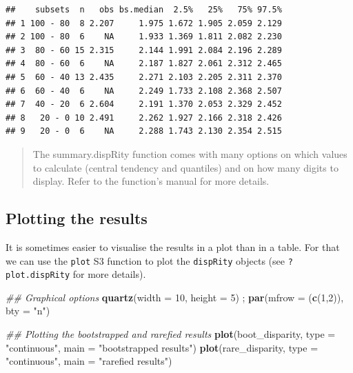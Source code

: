 \documentclass[]{book}
\newenvironment{Shaded}{\begin{snugshade}}{\end{snugshade}}
\newcommand{\CommentTok}[1]{\textcolor[rgb]{0.56,0.35,0.01}{\textit{#1}}}
\newcommand{\DataTypeTok}[1]{\textcolor[rgb]{0.13,0.29,0.53}{#1}}
\newcommand{\DecValTok}[1]{\textcolor[rgb]{0.00,0.00,0.81}{#1}}
\newcommand{\KeywordTok}[1]{\textcolor[rgb]{0.13,0.29,0.53}{\textbf{#1}}}
\newcommand{\NormalTok}[1]{#1}
\newcommand{\StringTok}[1]{\textcolor[rgb]{0.31,0.60,0.02}{#1}}
\begin{document}
\begin{verbatim}
##    subsets  n   obs bs.median  2.5%   25%   75% 97.5%
## 1 100 - 80  8 2.207     1.975 1.672 1.905 2.059 2.129
## 2 100 - 80  6    NA     1.933 1.369 1.811 2.082 2.230
## 3  80 - 60 15 2.315     2.144 1.991 2.084 2.196 2.289
## 4  80 - 60  6    NA     2.187 1.827 2.061 2.312 2.465
## 5  60 - 40 13 2.435     2.271 2.103 2.205 2.311 2.370
## 6  60 - 40  6    NA     2.249 1.733 2.108 2.368 2.507
## 7  40 - 20  6 2.604     2.191 1.370 2.053 2.329 2.452
## 8   20 - 0 10 2.491     2.262 1.927 2.166 2.318 2.426
## 9   20 - 0  6    NA     2.288 1.743 2.130 2.354 2.515
\end{verbatim}

\begin{quote}
The summary.dispRity function comes with many options on which values to calculate (central tendency and quantiles) and on how many digits to display. Refer to the function's manual for more details.
\end{quote}

\hypertarget{plotting-the-results}{%
\subsection{Plotting the results}\label{plotting-the-results}}

It is sometimes easier to visualise the results in a plot than in a table.
For that we can use the \texttt{plot} S3 function to plot the \texttt{dispRity} objects (see \texttt{?plot.dispRity} for more details).

\begin{Shaded}
\begin{Highlighting}[]
\CommentTok{## Graphical options}
\KeywordTok{quartz}\NormalTok{(}\DataTypeTok{width =} \DecValTok{10}\NormalTok{, }\DataTypeTok{height =} \DecValTok{5}\NormalTok{) ; }\KeywordTok{par}\NormalTok{(}\DataTypeTok{mfrow =}\NormalTok{ (}\KeywordTok{c}\NormalTok{(}\DecValTok{1}\NormalTok{,}\DecValTok{2}\NormalTok{)), }\DataTypeTok{bty =} \StringTok{"n"}\NormalTok{)}

\CommentTok{## Plotting the bootstrapped and rarefied results}
\KeywordTok{plot}\NormalTok{(boot_disparity, }\DataTypeTok{type =} \StringTok{"continuous"}\NormalTok{, }\DataTypeTok{main =} \StringTok{"bootstrapped results"}\NormalTok{)}
\KeywordTok{plot}\NormalTok{(rare_disparity, }\DataTypeTok{type =} \StringTok{"continuous"}\NormalTok{, }\DataTypeTok{main =} \StringTok{"rarefied results"}\NormalTok{)}
\end{Highlighting}
\end{Shaded}
\end{document}
